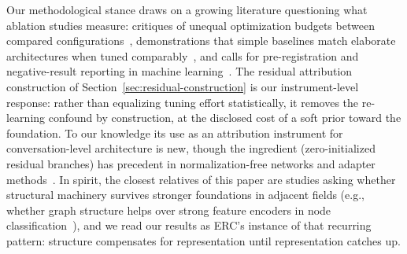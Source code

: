 Our methodological stance draws on a growing literature questioning what ablation studies measure: critiques of unequal optimization budgets between compared configurations~\cite{missbench2026,lucic2018gans,melis2017evaluation}, demonstrations that simple baselines match elaborate architectures when tuned comparably~\cite{liang2019strongsimple}, and calls for pre-registration and negative-result reporting in machine learning~\cite{farhadipour2025multimodal,pineau2021reproducibility}. The residual attribution construction of Section~\ref{sec:residual-construction} is our instrument-level response: rather than equalizing tuning effort statistically, it removes the re-learning confound by construction, at the disclosed cost of a soft prior toward the foundation. To our knowledge its use as an attribution instrument for conversation-level architecture is new, though the ingredient (zero-initialized residual branches) has precedent in normalization-free networks and adapter methods~\cite{bachlechner2020rezero,zhang2019fixup}. In spirit, the closest relatives of this paper are studies asking whether structural machinery survives stronger foundations in adjacent fields (e.g., whether graph structure helps over strong feature encoders in node classification~\cite{zhang2021graphless,huang2020labelprop}), and we read our results as ERC's instance of that recurring pattern: structure compensates for representation until representation catches up.
